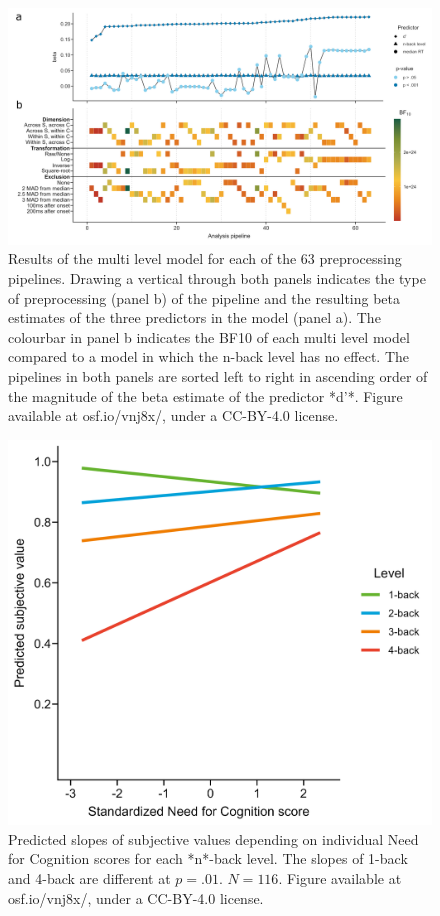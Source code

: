 \documentclass[
  man,floatsintext]{apa6}
\begin{document}
\begin{figure}[H]
\includegraphics[width=\textwidth]{Figures/sca-plot} \caption{Results of the multi level model for each of the 63 preprocessing pipelines. Drawing a vertical through both panels indicates the type of preprocessing (panel b) of the pipeline and the resulting beta estimates of the three predictors in the model (panel a). The colourbar in panel b indicates the BF10 of each multi level model compared to a model in which the n-back level has no effect. The pipelines in both panels are sorted left to right in ascending order of the magnitude of the beta estimate of the predictor *d'*. Figure available at osf.io/vnj8x/, under a CC-BY-4.0 license.}\label{fig:sca-plot}
\end{figure}

\begin{figure}[H]
\includegraphics[width=\textwidth]{Figures/nfccont_sv} \caption{Predicted slopes of subjective values depending on individual Need for Cognition scores for each *n*-back level. The slopes of 1-back and 4-back are different at $p=.01$. $N=116$. Figure available at osf.io/vnj8x/, under a CC-BY-4.0 license.}\label{fig:nfccont-sv}
\end{figure}
\end{document}
